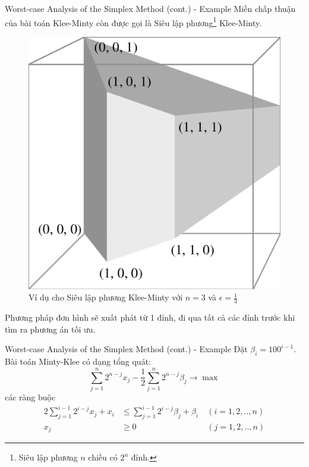 \documentclass[10pt]{beamer}
\begin{document}
\begin{frame}{Worst-case Analysis of the Simplex Method (cont.) - Example}
Miền chấp thuận của bài toán Klee-Minty còn được gọi là Siêu lập phương\footnote{Siêu lập phương $n$ chiều có $2^n$ đỉnh.} Klee-Minty.
\begin{figure}
\includegraphics[scale=.15]{img/klee-minty-cube.png}
\caption{Ví dụ cho Siêu lập phương Klee-Minty với $n = 3$ và $\epsilon = \frac{1}{3}$}
\end{figure}
Phương pháp đơn hình sẽ xuất phát từ 1 đỉnh, đi qua tất cả các đỉnh trước khi tìm ra phương án tối ưu.
\end{frame}

\begin{frame}{Worst-case Analysis of the Simplex Method (cont.) - Example}
Đặt $\beta_i = 100^{i - 1}$. Bài toán Minty-Klee có dạng tổng quát:
$$
\sum_{j = 1}^n 2^{n - j}x_j - \frac{1}{2}\sum_{j = 1}^n 2^{n - j}\beta_j \rightarrow \max
$$
các ràng buộc
$$
\begin{aligned}
2\sum_{j = 1}^{i - 1} 2^{i - j}x_j + x_i &\leq \sum_{j = 1}^{i - 1}2^{i - j}\beta_j + \beta_i\ &(i = 1, 2, .., n)\\
x_j &\geq 0 &(j = 1, 2, .., n)
\end{aligned}
$$
\end{frame}
\end{document}
